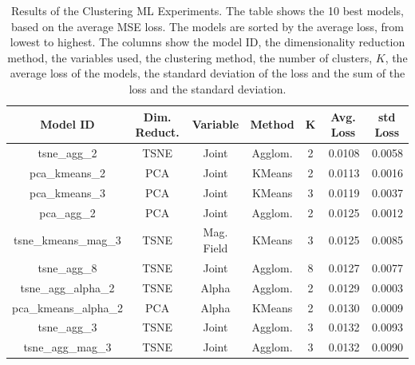\begin{table}[h]
    \caption[Results of the Clustering ML Experiments]{Results of the Clustering ML Experiments. The table shows the 10 best models, based on the average MSE loss. The models are sorted by the average loss, from lowest to highest. The columns show the model ID, the dimensionality reduction method, the variables used, the clustering method, the number of clusters, $K$, the average loss of the models, the standard deviation of the loss and the sum of the loss and the standard deviation.}\label{tab:clustering_ml_results}
    \begin{tabular}{@{}cccccrr@{}}
    \toprule
    \textbf{Model ID}     & \textbf{Dim. Reduct.} & \textbf{Variable} & \textbf{Method} & \textbf{K} & \multicolumn{1}{c}{\textbf{Avg. Loss}} & \multicolumn{1}{c}{\textbf{std Loss}} \\ \midrule
    tsne\_agg\_2          & TSNE                  & Joint             & Agglom.         & 2          & 0.0108                                 & 0.0058                                \\
    pca\_kmeans\_2        & PCA                   & Joint             & KMeans          & 2          & 0.0113                                 & 0.0016                                \\
    pca\_kmeans\_3        & PCA                   & Joint             & KMeans          & 3          & 0.0119                                 & 0.0037                                \\
    pca\_agg\_2           & PCA                   & Joint             & Agglom.         & 2          & 0.0125                                 & 0.0012                                \\
    tsne\_kmeans\_mag\_3  & TSNE                  & Mag. Field        & KMeans          & 3          & 0.0125                                 & 0.0085                                \\
    tsne\_agg\_8          & TSNE                  & Joint             & Agglom.         & 8          & 0.0127                                 & 0.0077                                \\
    tsne\_agg\_alpha\_2   & TSNE                  & Alpha             & Agglom.         & 2          & 0.0129                                 & 0.0003                                \\
    pca\_kmeans\_alpha\_2 & PCA                   & Alpha             & KMeans          & 2          & 0.0130                                 & 0.0009                                \\
    tsne\_agg\_3          & TSNE                  & Joint             & Agglom.         & 3          & 0.0132                                 & 0.0093                                \\
    tsne\_agg\_mag\_3     & TSNE                  & Joint             & Agglom.         & 3          & 0.0132                                 & 0.0090                                \\ \bottomrule
    \end{tabular}
\end{table}


